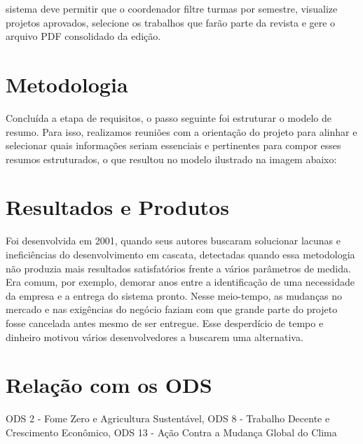 \documentclass[12pt,a4paper]{article}
\begin{document}
sistema deve permitir que o coordenador filtre turmas por semestre, visualize projetos aprovados, selecione os trabalhos que farão parte da revista e gere o arquivo PDF consolidado da edição.


\section*{Metodologia}

Concluída a etapa de requisitos, o passo seguinte foi estruturar o modelo de resumo. Para isso, realizamos reuniões com a orientação do projeto para alinhar e selecionar quais informações seriam essenciais e pertinentes para compor esses resumos estruturados, o que resultou no modelo ilustrado na imagem abaixo:


\section*{Resultados e Produtos}

Foi desenvolvida em 2001, quando seus autores buscaram solucionar lacunas e ineficiências do desenvolvimento em cascata, detectadas quando essa metodologia não produzia mais resultados satisfatórios frente a vários parâmetros de medida. Era comum, por exemplo,  demorar anos entre a identificação de uma necessidade da empresa e a entrega do sistema pronto. Nesse meio-tempo, as mudanças no mercado e nas exigências do negócio faziam com que grande parte do projeto fosse cancelada antes mesmo de ser entregue. Esse desperdício de tempo e dinheiro motivou vários desenvolvedores a buscarem uma alternativa.


\section*{Relação com os ODS}

ODS 2 - Fome Zero e Agricultura Sustentável, ODS 8 - Trabalho Decente e Crescimento Econômico, ODS 13 - Ação Contra a Mudança Global do Clima

\end{document}

